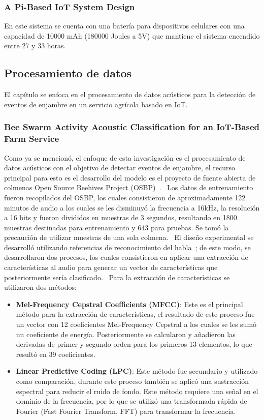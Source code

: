 \subsubsection{A Pi-Based IoT System Design}
En este sistema se cuenta con una batería para dispositivos celulares con una capacidad de 10000 mAh (180000 Joules a 5V) que mantiene el sistema encendido entre 27 y 33 horas.~\cite{chen_chien_hsu_jing_lin_lin_2020}

\subsection{Procesamiento de datos}
El capítulo se enfoca en el procesamiento de datos acústicos para la detección de eventos de enjambre en un servicio agrícola basado en IoT.

\subsubsection{Bee Swarm Activity Acoustic Classification for an IoT-Based Farm Service}
Como ya se mencionó, el enfoque de esta investigación es el procesamiento de datos acústicos con el objetivo de detectar eventos de enjambre, el recurso principal para esto es el desarrollo del modelo es el proyecto de fuente abierta de colmenas Open Source Beehives Project (OSBP)~\cite{open_source_beehives_project_iaac}.~\cite{zgank_2019}
Los datos de entrenamiento fueron recopilados del OSBP, los cuales consistieron de aproximadamente 122 minutos de audio a los cuales se les disminuyó la frecuencia a 16kHz, la resolución a 16 bits y fueron divididos en muestras de 3 segundos, resultando en 1800 muestras destinadas para entrenamiento y 643 para pruebas. Se tomó la precaución de utilizar muestras de una sola colmena.~\cite{zgank_2019}
El diseño experimental se desarrolló utilizando referencias de reconocimiento del habla~\cite{gales_young_2008}; de este modo, se desarrollaron dos procesos, los cuales consistieron en aplicar una extracción de características al audio para generar un vector de características que posteriormente sería clasificado.~\cite{zgank_2019}
Para la extracción de características se utilizaron dos métodos:
\begin{itemize}
    \item \textbf{Mel-Frequency Cepstral Coefficients (MFCC)}: Este es el principal método para la extracción de características, el resultado de este proceso fue un vector con 12 coeficientes Mel-Frequency Cepstral a los cuales se les sumó un coeficiente de energía. Posteriormente se calcularon y añadieron las derivadas de primer y segundo orden para los primeros 13 elementos, lo que resultó en 39 coeficientes.~\cite{zgank_2019}
    \item \textbf{Linear Predictive Coding (LPC)}: Este método fue secundario y utilizado como comparación, durante este proceso también se aplicó una sustracción espectral para reducir el ruido de fondo. Este método requiere una señal en el dominio de la frecuencia, por lo que se utilizó una transformada rápida de Fourier (Fast Fourier Transform, FFT) para transformar la frecuencia.~\cite{zgank_2019}
\end{itemize}
